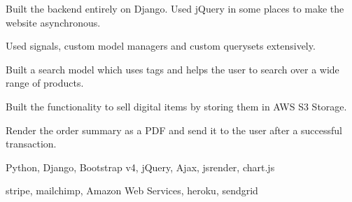 \begin{tightemize}
\item Built the backend entirely on Django. Used jQuery in some places to make the website asynchronous.
\item Used signals, custom model managers and custom querysets extensively.
\item Built a search model which uses tags and helps the user to search over a wide range of products.
\item Built the functionality to sell digital items by storing them in AWS S3 Storage.
\item Render the order summary as a PDF and send it to the user after a successful transaction.
\item {} Python, Django, Bootstrap v4, jQuery, Ajax, jsrender, chart.js
\item {} stripe, mailchimp, Amazon Web Services, heroku, sendgrid
\end{tightemize}
\sectionsep